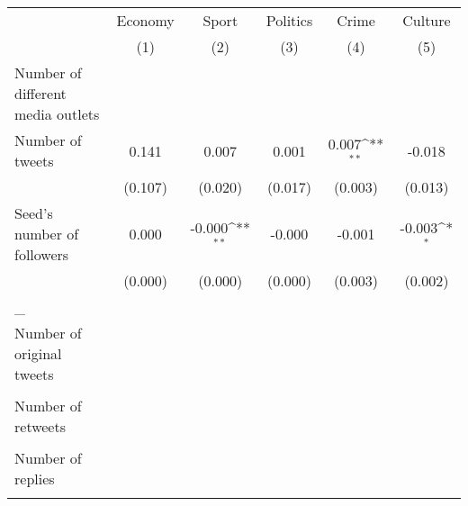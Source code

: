 {
\def\sym#1{\ifmmode^{#1}\else\(^{#1}\)\fi}
\begin{tabular}{l*{5}{c}}
\hline\hline
                    &\multicolumn{1}{c}{Economy}&\multicolumn{1}{c}{Sport}&\multicolumn{1}{c}{Politics}&\multicolumn{1}{c}{Crime}&\multicolumn{1}{c}{Culture}\\\cmidrule(lr){2-2}\cmidrule(lr){3-3}\cmidrule(lr){4-4}\cmidrule(lr){5-5}\cmidrule(lr){6-6}
                    &\multicolumn{1}{c}{(1)}         &\multicolumn{1}{c}{(2)}         &\multicolumn{1}{c}{(3)}         &\multicolumn{1}{c}{(4)}         &\multicolumn{1}{c}{(5)}         \\
\hline
Number of different media outlets&                     &                     &                     &                     &                     \\
Number of tweets    &       0.141         &       0.007         &       0.001         &       0.007\sym{**} &      -0.018         \\
                    &     (0.107)         &     (0.020)         &     (0.017)         &     (0.003)         &     (0.013)         \\
Seed's number of followers&       0.000         &      -0.000\sym{**} &      -0.000         &      -0.001         &      -0.003\sym{*}  \\
                    &     (0.000)         &     (0.000)         &     (0.000)         &     (0.003)         &     (0.002)         \\
\hline
\_                   &                     &                     &                     &                     &                     \\
Number of original tweets&                     &                     &                     &                     &                     \\
                    &                     &                     &                     &                     &                     \\
Number of retweets  &                     &                     &                     &                     &                     \\
                    &                     &                     &                     &                     &                     \\
Number of replies   &                     &                     &                     &                     &                     \\
                    &                     &                     &                     &                     &                     \\

\end{tabular}}
